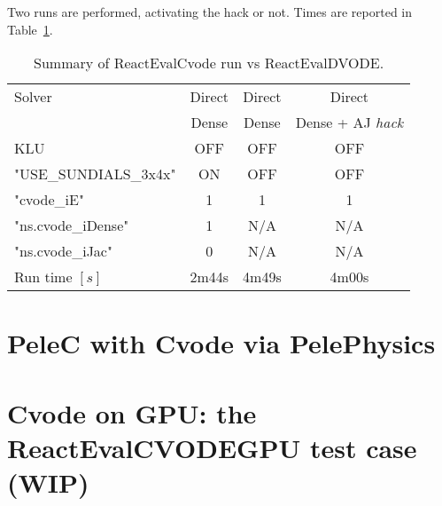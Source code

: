 \documentclass[12pt]{article}
\begin{document}
Two runs are performed, activating the hack or not. Times are reported in Table~\ref{Tab::CVODEvsDVODE}.
\begin{table}
\centering
\begin{tabular}{l c c c}
\hline 
Solver                            & Direct               & Direct               & Direct                                          \\
                                      & Dense              & Dense              & Dense + AJ \textit{hack}              \\
KLU                               &     OFF             &   OFF                  & OFF                                     \\
"USE_SUNDIALS_3x4x" &     ON               &   OFF                  & OFF                                   \\  
\hline 
"cvode_iE"              & 1                      &     1                         & 1                                         \\
"ns.cvode_iDense" & 1                      &    N/A                      & N/A                                     \\
"ns.cvode_iJac"      & 0                      &    N/A                      & N/A                                 \\
\hline
Run time $[s]$      &  2m44s           & 4m49s                     & 4m00s                             \\
\end{tabular}
\caption{Summary of ReactEvalCvode run vs ReactEvalDVODE.}
\label{Tab::CVODEvsDVODE}
\end{table}


\section{PeleC with Cvode via PelePhysics}

\section{Cvode on GPU: the ReactEvalCVODEGPU test case (WIP) }

\clearpage



%
\end{document}
